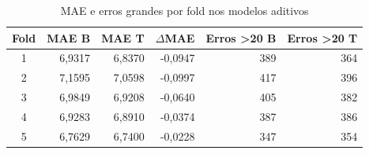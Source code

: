 \begin{table}[htbp]
\centering\small
\caption{MAE e erros grandes por fold nos modelos aditivos}\label{tab:estabilidade}
\begin{tabular}{crrrrr}
\toprule
Fold & MAE B & MAE T & $\Delta$MAE & Erros >20 B & Erros >20 T\\\midrule
1 & 6,9317 & 6,8370 & -0,0947 & 389 & 364\\
2 & 7,1595 & 7,0598 & -0,0997 & 417 & 396\\
3 & 6,9849 & 6,9208 & -0,0640 & 405 & 382\\
4 & 6,9283 & 6,8910 & -0,0374 & 387 & 386\\
5 & 6,7629 & 6,7400 & -0,0228 & 347 & 354\\
\bottomrule
\end{tabular}
\end{table}
